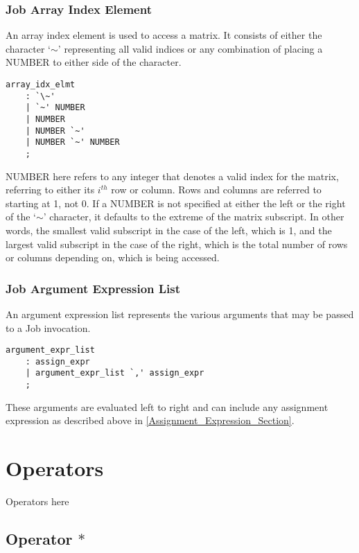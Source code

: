 \documentclass[prodmode,acmtecs]{acmsmall}
\begin{document}
\subsubsection{Job Array Index Element}

An array index element is used to access a matrix. It consists of either 
the character `$\sim$' representing all valid indices or any combination of placing
a NUMBER to either side of the character. 

\begin{lstlisting}
array_idx_elmt
	: `\~'
	| `~' NUMBER
	| NUMBER
	| NUMBER `~'
	| NUMBER `~' NUMBER
	;
\end{lstlisting}

NUMBER here refers to any integer that denotes a valid index for the 
matrix, referring to either its $i^{th}$ row or column. Rows and columns are 
referred to starting at 1, not 0. If a NUMBER is not specified at either 
the left or the right of the `$\sim$' character, it defaults to the extreme 
of the matrix subscript. In other words, the smallest valid subscript in 
the case of the left, which is 1, and the largest valid subscript in the 
case of the right, which is the total number of rows or columns depending
on, which is being accessed.

\subsubsection{Job Argument Expression List}

An argument expression list represents the various arguments that may be
passed to a Job invocation. 

\begin{lstlisting}
argument_expr_list
	: assign_expr
	| argument_expr_list `,' assign_expr
	;
\end{lstlisting}

These arguments are evaluated left to right and can include any assignment 
expression as described above in \ref{Assignment_Expression_Section}.

\section{Operators}
Operators here

\subsection{Operator $*$}
\end{document}
